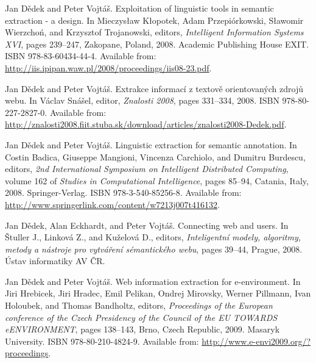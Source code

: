 \begin{description}
\item
Jan D{\v{e}}dek and Peter Vojt{\'{a}}{\v{s}}.
\newblock Exploitation of linguistic tools in semantic extraction - a design.
\newblock In Mieczys{{\l}}aw K{{\l}}opotek, Adam Przepi{\'{o}}rkowski,
  S{{\l}}awomir Wierzcho{\'{n}}, and Krzysztof Trojanowski, editors, {\em
  Intelligent Information Systems {XVI}}, pages 239--247, Zakopane, Poland,
  2008. Academic Publishing House {EXIT}.
\newblock ISBN 978-83-60434-44-4.
\newblock Available from:
  \url{http://iis.ipipan.waw.pl/2008/proceedings/iis08-23.pdf}.

\item
Jan D{\v{e}}dek and Peter Vojt{\'{a}}{\v{s}}.
\newblock Extrakce informac{\'{i}} z textov{\v{e}} orientovan{\'{y}}ch
  zdroj{\r{u}} webu.
\newblock In V{\'{a}}clav Sn{\'{a}}{\v{s}}el, editor, {\em Znalosti 2008},
  pages 331--334, 2008.
\newblock ISBN 978-80-227-2827-0.
\newblock Available from:
  \url{http://znalosti2008.fiit.stuba.sk/download/articles/znalosti2008-Dedek.pdf}.

\item
Jan D{\v{e}}dek and Peter Vojt{\'{a}}{\v{s}}.
\newblock Linguistic extraction for semantic annotation.
\newblock In Costin Badica, Giuseppe Mangioni, Vincenza Carchiolo, and Dumitru
  Burdescu, editors, {\em 2nd International Symposium on Intelligent
  Distributed Computing}, volume 162 of {\em Studies in Computational
  Intelligence}, pages 85--94, Catania, Italy, 2008. Springer-Verlag.
\newblock ISBN 978-3-540-85256-8.
\newblock Available from:
  \url{http://www.springerlink.com/content/w7213j007t416132}.

\item
Jan D{\v{e}}dek, Alan Eckhardt, and Peter Vojt{\'{a}}{\v{s}}.
\newblock Connecting web and users.
\newblock In \v{S}tuller J., Linkov\'{a} Z., and Ku\v{z}elov\'{a} D., editors,
  {\em Inteligentn\'{i} modely, algoritmy, metody a n\'{a}stroje pro
  vytv\'{a}\v{r}en\'{i} s\'{e}mantick\'{e}ho webu}, pages 39--44, Prague, 2008.
  \'{U}stav informatiky AV \v{C}R.

\item
Jan D{\v{e}}dek and Peter Vojt{\'{a}}{\v{s}}.
\newblock Web information extraction for e-environment.
\newblock In Jiri Hrebicek, Jiri Hradec, Emil Pelikan, Ondrej Mirovsky, Werner
  Pillmann, Ivan Holoubek, and Thomas Bandholtz, editors, {\em Proceedings of
  the European conference of the Czech Presidency of the Council of the {EU
  TOWARDS eENVIRONMENT}}, pages 138--143, Brno, Czech Republic, 2009. Masaryk
  University.
\newblock ISBN 978-80-210-4824-9.
\newblock Available from: \url{http://www.e-envi2009.org/?proceedings}.


\end{description}
